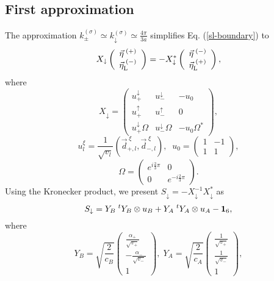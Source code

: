 \documentclass{jpsj3}
\begin{document}
\subsection{First approximation }
The approximation $k_\pm^{(\sigma)}
\simeq 
k_\downarrow^{(\sigma)}
\simeq \frac{4\pi}{3a}
$ 
simplifies Eq. (\ref{sl-boundary}) to
\begin{equation}
X_\downarrow
\left(
\begin{array}{c}
\vec{\eta}^{\;(+)} \\
\vec{\eta}^{\;(-)}_{\rm L}
\end{array}
\right)
=
-X_\downarrow^*
\left(
\begin{array}{c}
\vec{\eta}^{\;(-)} \\
\vec{\eta}^{\;(+)}_{\rm L}
\end{array}
\right),
\end{equation}
where 
\begin{equation}
X_\downarrow
= 
\left(
\begin{array}{ccc}
u_+^{\downarrow}
& 
u_-^{\downarrow}
& 
-u_0
\\
u_+^{\uparrow}
& 
u_-^{\uparrow}
& 
0
\\
u_+^{\downarrow}\Omega
& 
u_-^{\downarrow}\Omega
& 
-u_0\Omega^*
\end{array}
\right),
\end{equation}
\begin{equation}
u_l^{\xi}
=\frac{1}{\sqrt{v_l}}(\vec{d}_{+,l}^{\;\xi},\vec{d}_{-,l}^{\;\xi})
,\;\;
u_0
= 
\left(
\begin{array}{cc}
1 & -1 \\
1 & 1
\end{array}
\right),
\end{equation}
\begin{equation}
\Omega
= 
\left(
\begin{array}{cc}
e^{i\frac{2}{3}\pi}
& 0 \\
0 & e^{-i\frac{2}{3}\pi}
\end{array}
\right).
\end{equation}
Using the Kronecker product, we present
$S_\downarrow=-X_\downarrow^{-1}X_\downarrow^*$ 
as
\begin{equation}
S_{\downarrow}=
Y_B\;^tY_B\otimes u_B
+Y_A\;^tY_A\otimes u_A
-{\bf 1}_6,
\label{sl} 
\end{equation}
where 
\begin{equation}
Y_B
= 
\sqrt{\frac{2}{c_B}}
\left(
\begin{array}{cc}
\frac{\alpha_+}{\sqrt{v_+}}
\\
- \frac{\alpha_-}{\sqrt{v_-}}
\\
1
\end{array}
\right)
,\;
Y_A
= 
\sqrt{\frac{2}{c_A}}
\left(
\begin{array}{cc}
\frac{1}{\sqrt{v_+}}
\\
\frac{1}{\sqrt{v_-}}
\\
1
\end{array}
\right),
\end{equation}
\end{document}
